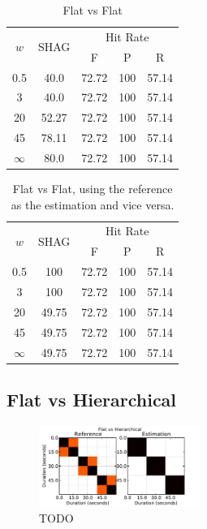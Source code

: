 \documentclass{article}
\begin{document}
\begin{table}
 \begin{center}
   \begin{tabular}{|c|c|c|c|c|}
  \hline
  \multirow{2}{*}{$w$} & \multirow{2}{*}{SHAG} & \multicolumn{3}{|c|}{Hit Rate} \\
  \cline{3-5}
            &        & F     & P     & R \\
  \hline
  0.5       & 40.0   & 72.72   & 100  & 57.14 \\
  3         & 40.0   & 72.72   & 100  & 57.14 \\
  20        & 52.27  & 72.72   & 100  & 57.14 \\
  45        & 78.11  & 72.72   & 100  & 57.14 \\
  $\infty$  & 80.0   & 72.72   & 100  & 57.14 \\
  \hline
 \end{tabular}
\end{center}
  \caption{Flat vs Flat}
  \label{tab:flat-flat}
\end{table}

\begin{table}
 \begin{center}
   \begin{tabular}{|c|c|c|c|c|}
  \hline
  \multirow{2}{*}{$w$} & \multirow{2}{*}{SHAG} & \multicolumn{3}{|c|}{Hit Rate} \\
  \cline{3-5}
       &      & F     & P     & R \\
  \hline
  0.5       & 100    & 72.72   & 100  & 57.14 \\
  3         & 100    & 72.72   & 100  & 57.14 \\
  20        & 49.75  & 72.72   & 100  & 57.14 \\
  45        & 49.75  & 72.72   & 100  & 57.14 \\
  $\infty$  & 49.75  & 72.72   & 100  & 57.14 \\
  \hline
 \end{tabular}
\end{center}
  \caption{Flat vs Flat, using the reference as the estimation and vice versa.}
  \label{tab:flat-flat-vice}
\end{table}


\subsection{Flat vs Hierarchical}

\begin{figure}
  \centering
  \includegraphics[width=0.47\textwidth]{plots/flat-hier.pdf}
  \caption{TODO}
  \label{fig:flat-hier}
\end{figure}%
\end{document}

